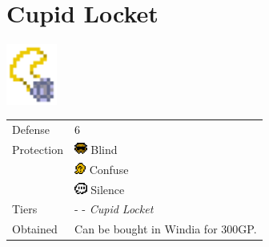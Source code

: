 \section{Cupid Locket}
\label{armor:cupid_locket}

\includegraphics[height=2cm,keepaspectratio]{./resources/armors/cupidlocket}

\begin{longtable}{ l p{9cm} }
	Defense
	& 6
\\ %
	Protection
	& \includegraphics[height=1em,keepaspectratio]{./resources/effects/blind}
	Blind \\
	& \includegraphics[height=1em,keepaspectratio]{./resources/effects/confusion}
	Confuse \\
	& \includegraphics[height=1em,keepaspectratio]{./resources/effects/silence}
	Silence
\\ %
	Tiers
	& \nameref{armor:charm} - \nameref{armor:magic_ring} - \textit{Cupid Locket}
\\ %
	Obtained
	& Can be bought in Windia for 300GP.
\end{longtable}
